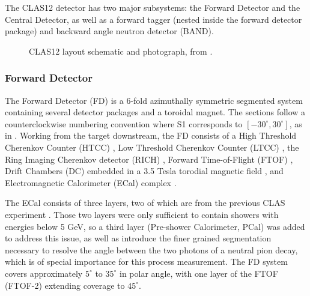 The CLAS12 detector  has two major subsystems: the Forward Detector and the Central Detector, as well as a forward tagger (nested inside the forward detector package) and backward angle neutron detector (BAND). 



\begin{figure}[H]
    \centering
    \hfill
    \caption[CLAS12 Layout]{CLAS12 layout schematic and photograph, from \parencite{Burkert2020TheLaboratory}.}\label{fig:clas12photo}
\end{figure}



\subsubsection*{Forward Detector}

    The Forward Detector (FD) is a 6-fold azimuthally symmetric segmented system containing several detector packages and a toroidal magnet. The sections follow a counterclockwise numbering convention where S1 corresponds to $[-30^{\circ}, 30^{\circ}]$, as in . Working from the target downstream, the FD consists of a High Threshold Cherenkov Counter (HTCC) \parencite{Sharabian2020TheCounter}, Low Threshold Cherenkov Counter (LTCC) \parencite{Ungaro2020TheDetector}, the Ring Imaging Cherenkov detector (RICH) \parencite{Contalbrigo2020TheDetector}, Forward Time-of-Flight (FTOF) \parencite{Carman2020TheSystem}, Drift Chambers (DC) \parencite{Mestayer2020TheSystem} embedded in a 3.5 Tesla torodial magnetic field \parencite{Fair2020TheMagnets}, and Electromagnetic Calorimeter (ECal) complex \parencite{Asryan2020TheCalorimeter}.

    The ECal consists of three layers, two of which are from the previous CLAS experiment \parencite{Amarian2001TheCalorimeter}. Those two layers were only sufficient to contain showers with energies below 5 GeV, so a third layer (Pre-shower Calorimeter, PCal) was added to address this issue, as well as introduce the finer grained segmentation necessary to resolve the angle between the two photons of a neutral pion decay, which is of special importance for this process measurement. The FD system covers approximately $5^{\circ}$ to $35^{\circ}$ in polar angle, with one layer of the FTOF (FTOF-2) extending coverage to $45^{\circ}$. 
    
